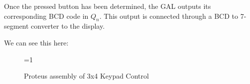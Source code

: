 Once the pressed button has been determined, the GAL outputs its corresponding BCD code in $Q_n$. This output is connected through a BCD to 7-segment converter to the display. \medskip

We can see this here:

\begin{figure}[H]
    \centering
 
    \ifnum\value{ANIMATION}=1 {
    } 
    \fi
    
    \caption{Proteus assembly of 3x4 Keypad Control}
    \label{fig:KEYPAD_PROTEUS}
\end{figure}























